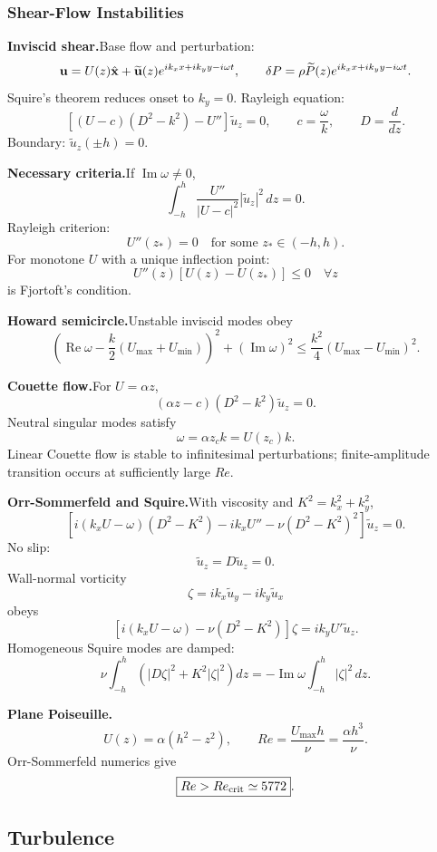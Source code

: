 \subsubsection*{Shear-Flow Instabilities}

\noindent\textbf{Inviscid shear.}\quad Base flow and perturbation:
\[
  \mathbf{u}=U(z)\hat{\mathbf x}+\widetilde{\mathbf{u}}(z)e^{ik_xx+ik_yy-i\omega t},
  \qquad
  \delta P=\rho\widetilde P(z)e^{ik_xx+ik_yy-i\omega t}.
\]
Squire's theorem reduces onset to $k_y=0$. Rayleigh equation:
\[
  \boxed{\left[(U-c)(D^2-k^2)-U''\right]\widetilde u_z=0},
  \qquad
  c=\frac{\omega}{k},\qquad D=\frac{d}{dz}.
\]
Boundary: $\widetilde u_z(\pm h)=0$.

\noindent\textbf{Necessary criteria.}\quad If $\operatorname{Im}\omega\ne0$,
\[
  \int_{-h}^{h}\frac{U''}{|U-c|^2}|\widetilde u_z|^2\,dz=0.
\]
Rayleigh criterion:
\[
  \boxed{U''(z_*)=0\quad \text{for some }z_*\in(-h,h)}.
\]
For monotone $U$ with a unique inflection point:
\[
  \boxed{U''(z)[U(z)-U(z_*)]\le0\quad \forall z}
\]
is Fjortoft's condition.

\noindent\textbf{Howard semicircle.}\quad Unstable inviscid modes obey
\[
  \boxed{\left(\operatorname{Re}\omega-\frac{k}{2}(U_{\max}+U_{\min})\right)^2
  +(\operatorname{Im}\omega)^2
  \le\frac{k^2}{4}(U_{\max}-U_{\min})^2}.
\]

\noindent\textbf{Couette flow.}\quad For $U=\alpha z$,
\[
  (\alpha z-c)(D^2-k^2)\widetilde u_z=0.
\]
Neutral singular modes satisfy
\[
  \omega=\alpha z_c k=U(z_c)k.
\]
Linear Couette flow is stable to infinitesimal perturbations; finite-amplitude transition occurs at sufficiently large $Re$.

\noindent\textbf{Orr-Sommerfeld and Squire.}\quad With viscosity and $K^2=k_x^2+k_y^2$,
\[
  \boxed{\left[i(k_xU-\omega)(D^2-K^2)-ik_xU''
  -\nu(D^2-K^2)^2\right]\widetilde u_z=0}.
\]
No slip:
\[
  \widetilde u_z=D\widetilde u_z=0.
\]
Wall-normal vorticity
\[
  \zeta=ik_x\widetilde u_y-ik_y\widetilde u_x
\]
obeys
\[
  \boxed{\left[i(k_xU-\omega)-\nu(D^2-K^2)\right]\zeta
  =ik_yU'\widetilde u_z}.
\]
Homogeneous Squire modes are damped:
\[
  \nu\int_{-h}^{h}\left(|D\zeta|^2+K^2|\zeta|^2\right)dz
  =-\operatorname{Im}\omega\int_{-h}^{h}|\zeta|^2\,dz.
\]

\noindent\textbf{Plane Poiseuille.}\quad
\[
  U(z)=\alpha(h^2-z^2),\qquad
  Re=\frac{U_{\max}h}{\nu}=\frac{\alpha h^3}{\nu}.
\]
Orr-Sommerfeld numerics give
\[
  \boxed{Re>Re_{\rm crit}\simeq5772}.
\]

\subsection{Turbulence}

